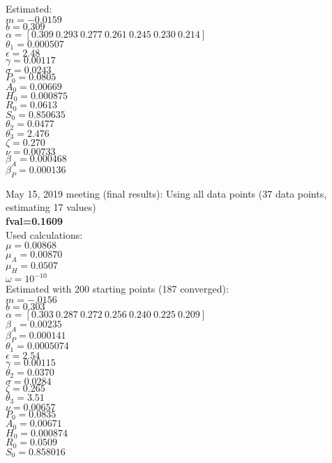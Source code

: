 \documentclass[12pt]{article}
\begin{document}
\begin{multicols}{2}
Estimated: \\
$m=-0.0159$ \\
$b=0.309$\\
$\alpha=[0.309  \   0.293  \   0.277    \   0.261 \    0.245 \     0.230  \  0.214  ]$ \\
$\theta_1=0.000507 $\\
$\epsilon=2.48$ \\
$\gamma=0.00117$\\
$\sigma=0.0243$ \\
$P_0=0.0805$ \\
$A_0=0.00669$ \\
$H_0=0.000875$ \\
$R_0=0.0613$ \\
$S_0=0.850635$ \\
$\theta_2=0.0477$ \\
$\theta_3=2.476$ \\
$\zeta=0.270$ \\
$\nu=0.00733$ \\ 
$\beta_A=0.000468$ \\
$\beta_P=0.000136$ \\
\end{multicols}





\pagebreak
May 15, 2019 meeting (final results): 
Using all data points (37 data points, estimating 17 values) \\

\textbf{fval=0.1609} \\
Used calculations: \\
$\mu=0.00868$ \\
$\mu_{A}=0.00870$ \\
$\mu_{H}=0.0507$ \\
$\omega=10^{-10}$ \\ 

Estimated with 200 starting points (187 converged): \\
$m=-.0156$ \\
$b=0.303$\\
$\alpha=[0.303  \   0.287  \   0.272    \   0.256 \    0.240 \     0.225  \  0.209  ]$ \\
$\beta_A=0.00235$\\
$\beta_P=0.000141$\\
$\theta_1=0.0005074$\\
$\epsilon=2.54$ \\
$\gamma=0.00115$\\
$\theta_2=0.0370$\\
$\sigma=0.0284$\\
$\zeta=0.265$\\
$\theta_3=3.51$\\ 
$\nu=0.00657$\\
$P_0=0.0835$\\
$A_0=0.00671$\\
$H_0=0.000874$\\
$R_0=0.0509$\\
$S_0=0.858016$\\
\end{document}
